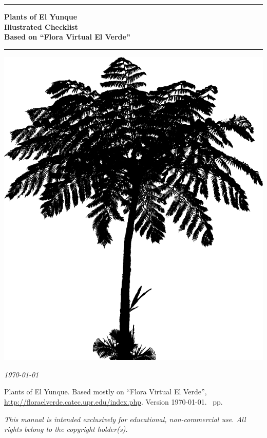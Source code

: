 \documentclass[10pt,twoside]{report}
\makeatletter
\renewcommand{\tableofcontents}[1][\contentsname]{%
  \thispagestyle{empty}
  \section*{#1}
  \begin{multicols}{2}
    \@starttoc{toc}
  \end{multicols}
}
\makeatother
\begin{document}
\begin{titlepage}
\begin{flushright}

\rule{\linewidth}{1mm}
\Huge\bfseries\sffamily
Plants of El Yunque\\[.5ex]
\huge Illustrated Checklist\\
\vspace*{1cm}
\Large\mdseries
Based on ``Flora Virtual El Verde''\\
\rule{\linewidth}{1mm}
\end{flushright}

\vspace*{1cm}
\begin{flushright}
\includegraphics[width=.7\textwidth]{../../input/misc/cyathea_logo.png}\\
\end{flushright}

\hfill\small\it\today
{}
\end{titlepage}


\begin{titlepage}

\noindent Plants of El Yunque. Based mostly on ``Flora Virtual El Verde'', \url{http://floraelverde.catec.upr.edu/index.php}. Version \today. \pageref{LastPage}~pp.

\vspace*{1cm}

\begin{center}
\textsl{This manual is intended exclusively for educational, non-commercial use. All rights belong to the copyright holder(s).}
\end{center}


\end{titlepage}

\setcounter{page}{3}



\newpage

\tableofcontents
\end{document}
